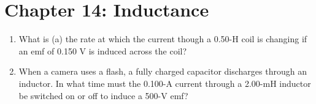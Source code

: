 \documentclass[10pt]{article}
\begin{document}
\section{Chapter 14: Inductance}

\begin{enumerate}
\item What is (a) the rate at which the current though a 0.50-H coil is changing if an emf of 0.150 V is induced across the coil? \\ \vspace{1cm}
\item When a camera uses a flash, a fully charged capacitor discharges through an inductor. In what time must the 0.100-A current through a 2.00-mH inductor be switched on or off to induce a 500-V emf?
\end{enumerate}
\end{document}
